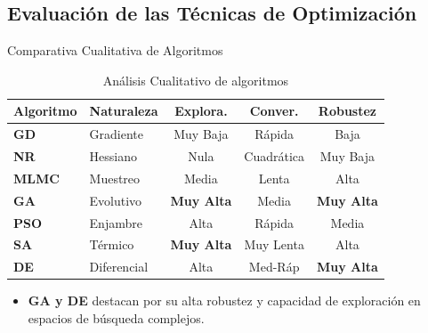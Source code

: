 \documentclass[xcolor={table,dvipsnames}]{beamer}
\begin{document}
\subsection{Evaluaci\'on de las T\'ecnicas de Optimizaci\'on}

\begin{frame}{Comparativa Cualitativa de Algoritmos}
    \centering
    \small
    \renewcommand{\arraystretch}{1.2}
    \setlength{\tabcolsep}{5pt}

    \begin{table}
        \caption{An\'alisis Cualitativo de algoritmos}
        \label{tab:ana_cual}
        \begin{tabularx}{\textwidth}{|l|X|c|c|c|}
            \hline
            \rowcolor[HTML]{C0C0C0}
            \textbf{Algoritmo} & \textbf{Naturaleza} & \textbf{Explora.} & \textbf{Conver.} & \textbf{Robustez} \\ \hline
            \textbf{GD} & Gradiente & Muy Baja & R\'apida & Baja \\ \hline
            \textbf{NR} & Hessiano & Nula & Cuadr\'atica & Muy Baja \\ \hline
            \textbf{MLMC} & Muestreo & Media & Lenta & Alta \\ \hline
            \rowcolor[HTML]{E8F4FD}
            \textbf{GA} & Evolutivo & \textbf{Muy Alta} & Media & \textbf{Muy Alta} \\ \hline
            \textbf{PSO} & Enjambre & Alta & R\'apida & Media \\ \hline
            \textbf{SA} & T\'ermico & \textbf{Muy Alta} & Muy Lenta & Alta \\ \hline
            \rowcolor[HTML]{E8F4FD}
            \textbf{DE} & Diferencial & Alta & Med-R\'ap & \textbf{Muy Alta} \\ \hline
        \end{tabularx}
    \end{table}

    \vspace{0.2cm}
    \begin{itemize}
        \item \footnotesize \textbf{GA y DE} destacan por su alta robustez y capacidad de exploraci\'on en espacios de b\'usqueda complejos.
    \end{itemize}
\end{frame}
\end{document}
